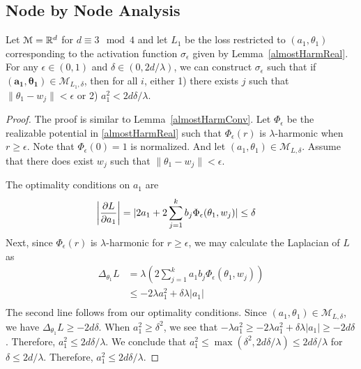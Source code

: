 \subsection{Node by Node Analysis}

\begin{lemma}\label{nodeConv}
Let $\mathcal{M} = {\mathbb{R}}^d$ for $d \equiv 3 \mod 4$ and let $L_1$ be the loss restricted to $(a_1,\theta_1)$ corresponding to the activation function $\sigma_\epsilon$ given by Lemma~\ref{almostHarmReal}. For any $\epsilon \in (0,1)$ and $\delta \in (0, 2d/\lambda)$, we can construct $\sigma_\epsilon$ such that if $\boldsymbol{(a_1,\theta_1)} \in \mathcal{M}_{L_1,\delta}$, then for all $i$, either 1) there exists $j$ such that $\|\theta_1 - w_j\| < \epsilon$ or 2) $a_1^2 < 2d\delta/\lambda$.
\end{lemma}

\begin{proof}
The proof is similar to Lemma~\ref{almostHarmConv}. Let $\Phi_\epsilon$ be the realizable potential in \ref{almostHarmReal} such that $\Phi_\epsilon(r)$ is $\lambda$-harmonic when $r \geq \epsilon$. Note that $\Phi_\epsilon(0) = 1$ is normalized. And let $(a_1,\theta_1) \in \mathcal{M}_{L,\delta}$. Assume that there does exist $w_j$ such that $\|\theta_1 - w_j\| < \epsilon$. 
 
The optimality conditions on ${ a_1}$ are 
\begin{align*}
   \left| \frac{\partial L}{\partial a_1} \right| & = \lvert 2a_1  + 2\sum_{j=1}^k b_j \Phi_\epsilon(\theta_1,w_j) \rvert \leq \delta
\end{align*}
%
Next, since $\Phi_\epsilon(r)$ is $\lambda$-harmonic for $r \geq \epsilon$, we may calculate the Laplacian of $L$ as
%
\begin{align*}
\Delta_{\theta_1} L & = \lambda \left(2\sum_{j=1}^k a_1b_j
  \Phi_\epsilon(\theta_1, w_j) \right) \\
& \leq  -2\lambda a_1^2 + \delta \lambda |a_1| \\
\end{align*} 
%
The second line follows from our optimality conditions. Since ${(a_1,\theta_1)} \in \mathcal{M}_{L,\delta}$, we have $\Delta_{\theta_1} L \geq - 2d\delta$. When $a_1^2 \geq \delta^2$, we see that $-\lambda a_1^2 \geq -2 \lambda a_1^2 + \delta\lambda |a_1| \geq -2d\delta$. Therefore, $a_1^2 \leq 2d\delta/\lambda$. We conclude that $a_1^2 \leq \max(\delta^2, 2d\delta/\lambda) \leq 2d\delta/\lambda$ for $\delta\leq 2d/\lambda$. Therefore, $a_1^2 \leq 2d\delta/\lambda$.
\end{proof}

